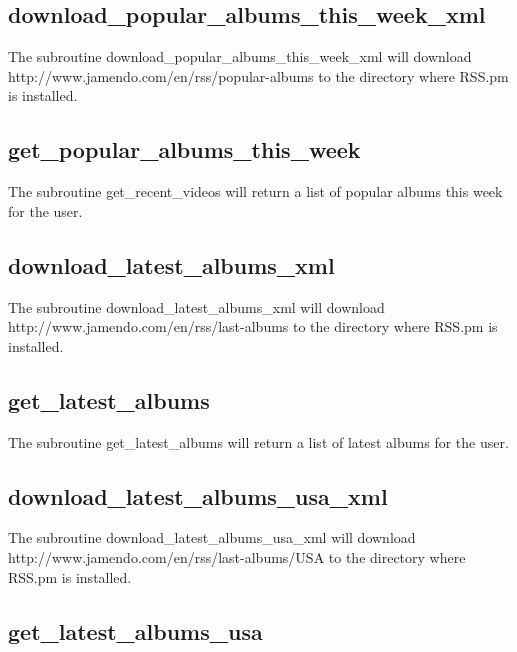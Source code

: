 \subsection*{download\_popular\_albums\_this\_week\_xml\label{download_popular_albums_this_week_xml}}


The subroutine download\_popular\_albums\_this\_week\_xml will download http://www.jamendo.com/en/rss/popular-albums
to the directory where RSS.pm is installed.

\subsection*{get\_popular\_albums\_this\_week\label{get_popular_albums_this_week}}


The subroutine get\_recent\_videos will return a list of popular albums this week for the user.

\subsection*{download\_latest\_albums\_xml\label{download_latest_albums_xml}}


The subroutine download\_latest\_albums\_xml will download http://www.jamendo.com/en/rss/last-albums
to the directory where RSS.pm is installed.

\subsection*{get\_latest\_albums\label{get_latest_albums}}


The subroutine get\_latest\_albums will return a list of latest albums for the user.

\subsection*{download\_latest\_albums\_usa\_xml\label{download_latest_albums_usa_xml}}


The subroutine download\_latest\_albums\_usa\_xml will download http://www.jamendo.com/en/rss/last-albums/USA
to the directory where RSS.pm is installed.

\subsection*{get\_latest\_albums\_usa\label{get_latest_albums_usa}}


